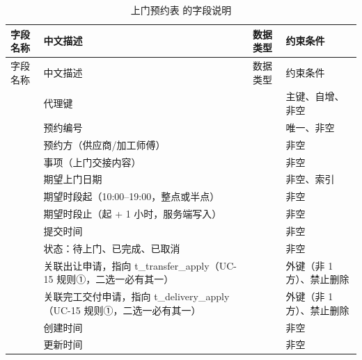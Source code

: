 \begin{longtable}{@{}L{3.5cm} L{4.1cm} L{2.9cm} L{4.0cm}@{}}
\caption{上门预约表  的字段说明}\label{tab:f-t-visit-appt}\\
\toprule
字段名称 & 中文描述 & 数据类型 & 约束条件 \\
\midrule
\endfirsthead
\toprule
字段名称 & 中文描述 & 数据类型 & 约束条件 \\
\midrule
\endhead
\bottomrule
\endlastfoot
{} & 代理键 &  & 主键、自增、非空 \\
 & 预约编号 &  & 唯一、非空 \\
 & 预约方（供应商/加工师傅） &  & 非空 \\
 & 事项（上门交接内容） &  & 非空 \\
 & 期望上门日期 &  & 非空、索引 \\
 & 期望时段起（10:00--19:00，整点或半点） &  & 非空 \\
 & 期望时段止（起 + 1 小时，服务端写入） &  & 非空 \\
 & 提交时间 &  & 非空 \\
 & 状态：待上门、已完成、已取消 &  & 非空 \\
 & 关联出让申请，指向 t\_transfer\_apply（UC-15 规则①，二选一必有其一） &  & 外键（非 1 方）、禁止删除 \\
 & 关联完工交付申请，指向 t\_delivery\_apply（UC-15 规则①，二选一必有其一） &  & 外键（非 1 方）、禁止删除 \\
 & 创建时间 &  & 非空 \\
 & 更新时间 &  & 非空 \\
\end{longtable}

